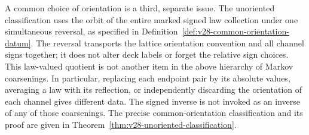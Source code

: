 A common choice of orientation is a third, separate issue.  The unoriented
classification uses the orbit of the entire marked signed law collection
under one simultaneous reversal, as specified in
Definition~\ref{def:v28-common-orientation-datum}.  The reversal transports the
lattice orientation convention and all channel signs together; it does not
alter deck labels or forget the relative sign choices.  This law-valued
quotient is not another item in the above hierarchy of Markov coarsenings.
In particular, replacing each endpoint pair by its absolute values, averaging
a law with its reflection, or independently discarding the orientation of
each channel gives different data.  The signed inverse is not invoked as an
inverse of any of those coarsenings.  The precise common-orientation
classification and its proof are given in
Theorem~\ref{thm:v28-unoriented-classification}.
